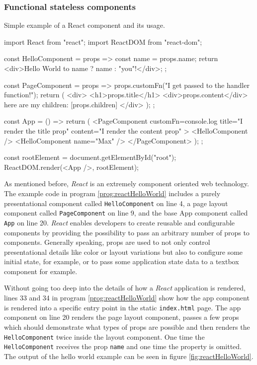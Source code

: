 \subsubsection{Functional stateless components}

\begin{program}
\caption{Simple example of a React component and its usage.} 
\label{prog:reactHelloWorld}
\begin{JsCode}
import React from "react";
import ReactDOM from "react-dom";

const HelloComponent = props => {
  const name = props.name;
  return <div>Hello World to {name ? name : "you"}!</div>;
};

const PageComponent = props => {
  props.customFn("I get passed to the handler function!");
  return (
    <div>
      <h1>{props.title}</h1>
      <div>{props.content}</div>
      here are my children: [{props.children}]
    </div>
  );
};

const App = () => {
  return (
    <PageComponent
      customFn={console.log}
      title="I render the title prop"
      content="I render the content prop"
    >
      <HelloComponent />
      <HelloComponent name={"Max"} />
    </PageComponent>
  );
};

const rootElement = document.getElementById("root");
ReactDOM.render(<App />, rootElement);  
\end{JsCode}
\end{program}

As mentioned before, \emph{React} is an extremely component oriented web technology. The example code in program \ref{prog:reactHelloWorld} includes a purely presentational component called \texttt{Hello\-Component} on line 4, a page layout component called \texttt{PageComponent} on line 9, and the base App component called \texttt{App} on line 20. \emph{React} enables developers to create reusable and configurable components by providing the possibility to pass an arbitrary number of props to components. Generally speaking, props are used to not only control presentational details like color or layout variations but also to configure some initial state, for example, or to pass some application state data to a textbox component for example.

Without going too deep into the details of how a \emph{React} application is rendered, lines 33 and 34 in program \ref{prog:reactHelloWorld} show how the app component is rendered into a specific entry point in the static \texttt{index.html} page. The app component on line 20 renders the page layout component, passes a few props which should demonstrate what types of props are possible and then renders the \texttt{HelloComponent} twice inside the layout component. One time the \texttt{HelloComponent} receives the prop \texttt{name} and one time the property is omitted. The output of the hello world example can be seen in figure \ref{fig:reactHelloWorld}. 

